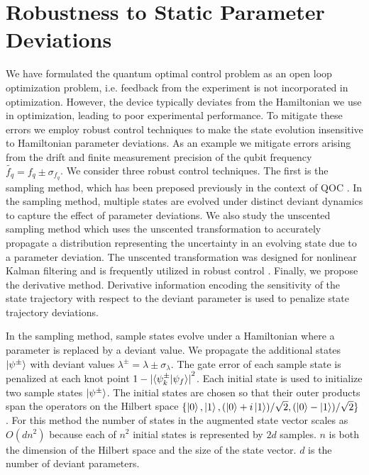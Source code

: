 \documentclass[
  amsfonts,
  amsmath,
  tbtags,
  amssymb,
  aps,
  nobibnotes,
  twocolumn,
  superscriptaddress,
]{revtex4-2}
\begin{document}
\section{Robustness to Static Parameter Deviations}
We have formulated the quantum optimal control
problem as an open loop optimization problem, i.e.
feedback from the experiment is not incorporated in optimization.
However, the device typically deviates from the Hamiltonian we use in optimization,
leading to poor experimental performance. To mitigate
these errors we employ robust control techniques
to make the state evolution insensitive to Hamiltonian
parameter deviations. As an example
we mitigate errors arising from the drift and finite measurement
precision of the qubit frequency $\tilde{f_{q}} = f_{q} \pm \sigma_{f_{q}}$.
We consider three robust control techniques.
The first is the sampling method, which has
been preposed previously in the context of QOC
\cite{rembold2020introduction, reinhold2019controlling, carvalho2020error}. In the
sampling method, multiple states are evolved under distinct deviant dynamics
to capture the effect of parameter deviations. We also
study the unscented sampling method which uses the unscented
transformation to accurately propagate a distribution
representing the uncertainty in an evolving state
due to a parameter deviation.
The unscented transformation was designed for nonlinear Kalman
filtering and is frequently utilized in robust control
\cite{julier2004unscented, lee2013sigma, manchester2016derivative}.
Finally, we propose the derivative method. Derivative
information encoding the sensitivity of the
state trajectory with respect to the deviant parameter
is used to penalize state trajectory deviations.

In the sampling method, sample states evolve under a
Hamiltonian where a parameter is replaced by
a deviant value. We propagate the additional states $\ket{\psi^{\pm}}$ with
deviant values $\lambda^{\pm} = \lambda \pm \sigma_{\lambda}$.
The gate error of each sample state is 
penalized at each knot point
$1 - {\lvert \braket{\psi^{\pm}_{k} | \psi_{f}} \rvert}^{2}$.
Each initial state is used to initialize two
sample states $\ket{\psi^{\pm}}$.
The initial states are chosen so
that their outer products span the operators on the
Hilbert space $\{\ket{0}, \ket{1}, (\ket{0} + i\ket{1}) / \sqrt{2},
(\ket{0} - \ket{1}) / \sqrt{2}\}$ \cite{chow2009randomized}.
For this method the number of states in the augmented state vector
scales as $O(dn^{2})$ because each of $n^{2}$ initial
states is represented by $2d$ samples. $n$ is both the dimension of the Hilbert space
and the size of the state vector. $d$ is the number of deviant parameters.
\end{document}
